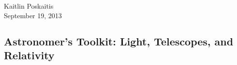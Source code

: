 \documentclass[12pt]{article}
\begin{document}
\noindent Kaitlin Poskaitis\\
September 19, 2013
\begin{center}
\section*{\bf Astronomer’s Toolkit: Light, Telescopes, and Relativity}
\end{center}
\end{document}
